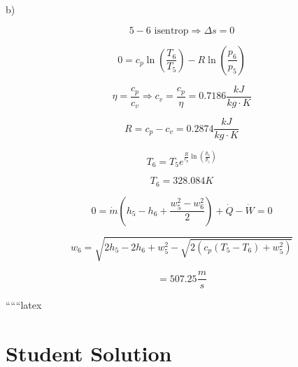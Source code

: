 b)

\[
5-6 \text{ isentrop} \Rightarrow \Delta s = 0
\]

\[
0 = c_p \ln \left( \frac{T_6}{T_5} \right) - R \ln \left( \frac{p_6}{p_5} \right)
\]

\[
\eta = \frac{c_p}{c_v} \Rightarrow c_v = \frac{c_p}{\eta} = 0.7186 \frac{kJ}{kg \cdot K}
\]

\[
R = c_p - c_v = 0.2874 \frac{kJ}{kg \cdot K}
\]

\[
T_6 = T_5 e^{\frac{R}{c_p} \ln \left( \frac{p_6}{p_5} \right)}
\]

\[
T_6 = 328.084 K
\]

\[
0 = \dot{m} \left( h_5 - h_6 + \frac{w_5^2 - w_6^2}{2} \right) + \dot{Q} - \dot{W} = 0
\]

\[
w_6 = \sqrt{2 h_5 - 2 h_6 + w_5^2 - \sqrt{2 \left( c_p \left( T_5 - T_6 \right) + w_5^2 \right)}}
\]

\[
= 507.25 \frac{m}{s}
\]

``````latex


\section*{Student Solution}